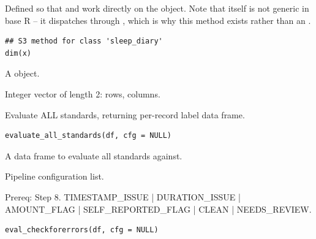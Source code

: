 \documentclass[a4paper]{book}
\begin{document}
%
\begin{Description}
Defined so that  and  work directly on the object.
Note that  itself is not generic in base R -- it dispatches
through , which is why this method exists rather than an
.
\end{Description}
%
\begin{Usage}
\begin{verbatim}
## S3 method for class 'sleep_diary'
dim(x)
\end{verbatim}
\end{Usage}
%
\begin{Arguments}
\begin{ldescription}
\item[\code{x}] A  object.
\end{ldescription}
\end{Arguments}
%
\begin{Value}
Integer vector of length 2: rows, columns.
\end{Value}
%
\begin{Description}
Evaluate ALL standards, returning per-record label data frame.
\end{Description}
%
\begin{Usage}
\begin{verbatim}
evaluate_all_standards(df, cfg = NULL)
\end{verbatim}
\end{Usage}
%
\begin{Arguments}
\begin{ldescription}
\item[\code{df}] A data frame to evaluate all standards against.

\item[\code{cfg}] Pipeline configuration list.
\end{ldescription}
\end{Arguments}
%
\begin{Description}
Prereq: Step 8. TIMESTAMP\_ISSUE | DURATION\_ISSUE | AMOUNT\_FLAG |
SELF\_REPORTED\_FLAG | CLEAN | NEEDS\_REVIEW.
\end{Description}
%
\begin{Usage}
\begin{verbatim}
eval_checkforerrors(df, cfg = NULL)
\end{verbatim}
\end{Usage}
\end{document}
